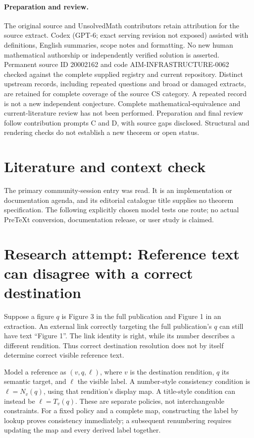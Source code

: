 \documentclass[11pt]{article}
\begin{document}
\paragraph{Preparation and review.}
The original source and UnsolvedMath contributors retain attribution for the source extract. Codex (GPT-6; exact serving revision not exposed) assisted with definitions, English summaries, scope notes and formatting. No new human mathematical authorship or independently verified solution is asserted. Permanent source ID 20002162 and code AIM-INFRASTRUCTURE-0062 checked against the complete supplied registry and current repository. Distinct upstream records, including repeated questions and broad or damaged extracts, are retained for complete coverage of the source CS category. A repeated record is not a new independent conjecture. Complete mathematical-equivalence and current-literature review has not been performed. Preparation and final review follow contribution prompts C and D, with source gaps disclosed. Structural and rendering checks do not establish a new theorem or open status.
\label{end:20002162}

\section{Literature and context check}
The primary community-session entry was read. It is an implementation or documentation agenda, and its editorial catalogue title supplies no theorem specification. The following explicitly chosen model tests one route; no actual PreTeXt conversion, documentation release, or user study is claimed.
\section{Research attempt: Reference text can disagree with a correct destination}
Suppose a figure $q$ is Figure 3 in the full publication and Figure 1 in an extraction. An external link correctly targeting the full publication's $q$ can still have text ``Figure 1''. The link identity is right, while its number describes a different rendition. Thus correct destination resolution does not by itself determine correct visible reference text.

Model a reference as $(v,q,\ell)$, where $v$ is the destination rendition, $q$ its semantic target, and $\ell$ the visible label. A number-style consistency condition is $\ell=N_v(q)$, using that rendition's display map. A title-style condition can instead be $\ell=T_v(q)$. These are separate policies, not interchangeable constraints. For a fixed policy and a complete map, constructing the label by lookup proves consistency immediately; a subsequent renumbering requires updating the map and every derived label together.
\end{document}
